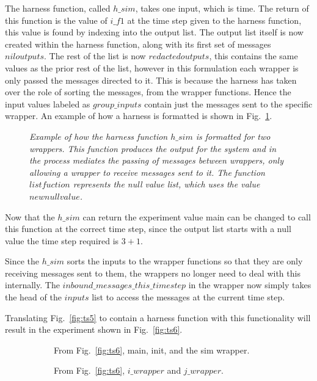 \documentclass{article}
\begin{document}
The harness function, called $h\_sim$, takes one input, which is time. The return of this function is the value of $i\_f1$ at the time step given to the harness function, this value is found by indexing into the output list. The output list itself is now created within the harness function, along with its first set of messages $niloutputs$. The rest of the list is now $redactedoutputs$, this contains the same values as the prior rest of the list, however in this formulation each wrapper is only passed the messages directed to it. This is because the harness has taken over the role of sorting the messages, from the wrapper functions. Hence the input values labeled as $group\_inputs$ contain just the messages sent to the specific wrapper. An example of how a harness is formatted is shown in Fig.~\ref{fig:harn6}.
\begin{figure}[H]
	\centering
	
	\caption{\it Example of how the harness function $h\_sim$ is formatted for two wrappers. This function produces the output for the system and in the process mediates the passing of messages between wrappers, only allowing a wrapper to receive messages sent to it. The function $listfuction$ represents the null value list, which uses the value $newnullvalue$.  }
	\label{fig:harn6}
\end{figure} 

Now that the $h\_sim$ can return the experiment value main can be changed to call this function at the correct time step, since the output list starts with a null value the time step required is $3+1$. 

Since the $h\_sim$ sorts the inputs to the wrapper functions so that they are only receiving messages sent to them, the wrappers no longer need to deal with this internally. The $inbound\_messages\_this\_timestep$ in the wrapper now simply takes the head of the $inputs$ list to access the messages at the current time step. 

Translating Fig.~\ref{fig:ts5} to contain a harness function with this functionality will result in the experiment shown in Fig.~\ref{fig:ts6}.
\begin{figure}[H]
	\centering
	\begin{subfigure}[b]{1\textwidth}
	
	\caption{From Fig.~\ref{fig:ts6}, main, init, and the sim wrapper.  }
        \label{fig:ts61}
	\end{subfigure}
	\caption*{}
\end{figure}
	
\begin{figure}[H]\ContinuedFloat
	\centering
	\begin{subfigure}[b]{1\textwidth}
	
	\caption{From Fig.~\ref{fig:ts6}, $i\_wrapper$ and $j\_wrapper$.  }
        \label{fig:ts62}
	\end{subfigure}
	\caption*{}
\end{figure}
	
\end{document}

